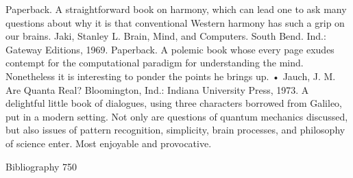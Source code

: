   Paperback. A straightforward book on harmony, which can lead one to ask many
  questions about why it is that conventional Western harmony has such a grip on our
  brains.
Jaki, Stanley L. Brain, Mind, and Computers. South Bend. Ind.: Gateway Editions, 1969.
  Paperback. A polemic book whose every page exudes contempt for the computational
  paradigm for understanding the mind. Nonetheless it is interesting to ponder the points
  he brings up.
• Jauch, J. M. Are Quanta Real? Bloomington, Ind.: Indiana University Press, 1973. A
  delightful little book of dialogues, using three characters borrowed from Galileo, put in
  a modern setting. Not only are questions of quantum mechanics discussed, but also
  issues of pattern recognition, simplicity, brain processes, and philosophy of science
  enter. Most enjoyable and provocative.

Bibliography                                                                            750

